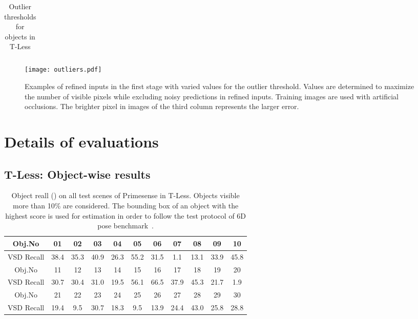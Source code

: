 \documentclass[10pt,twocolumn,letterpaper]{article}
\begin{document}
\begin{itemize}
{\begin{table}[hbt]
\begin{center}
\begin{tabular}{ c| c c c c c c c c c c c c c c c c c c c c c c c c c c c c c c}
\end{tabular}
\end{center}
\caption{Outlier thresholds  for objects in T-Less}
\end{table}

\begin{figure}[hbt]
\begin{center}
   \texttt{[image: outliers.pdf]}
\end{center}
\caption{Examples of refined inputs in the first stage with varied values for the outlier threshold. Values are determined to maximize the number of visible pixels while excluding noisy predictions in refined inputs. Training images are used with artificial occlusions. The brighter pixel in images of the third column represents the larger error.}
\label{fig:outlier}
\end{figure}
}
\end{itemize}


\newpage
\section{Details of evaluations}
\vspace{5pt}

\subsection{T-Less: Object-wise results}
\setlength{\tabcolsep}{12pt}

\begin{table}[hbt]\centering \begin{center}
\begin{tabular}{ c| c c c c c c c c c c}
  \hline
 Obj.No &01 &02 & 03 & 04 & 05 & 06 & 07 & 08 & 09 & 10  \\
 \hline
 VSD Recall   &38.4 &35.3& 40.9 & 26.3 & 55.2 & 31.5 &1.1 & 13.1 & 33.9 &45.8  \\
  \hline
  \hline
  Obj.No& 11 & 12 & 13 & 14 & 15 &16 & 17 & 18 & 19 & 20  \\
 \hline
 VSD Recall & 30.7 & 30.4 &31.0 & 19.5 & 56.1  &66.5&37.9 &45.3& 21.7 & 1.9   \\
 \hline
 \hline
  Obj.No & 21 & 22 & 23 & 24 & 25 &26 & 27 & 28 & 29& 30 \\
 \hline
 VSD Recall&19.4 & 9.5 &30.7 & 18.3 & 9.5 &13.9 & 24.4 & 43.0 & 25.8 & 28.8     \\
 \hline
 
 \end{tabular}
 \vspace{+1em}
\caption{Object reall () on all test scenes of Primesense in T-Less. Objects visible more than 10\% are considered. The bounding box of an object with the highest score is used for estimation in order to follow the test protocol of 6D pose benchmark~\cite{Hodan_2018_ECCV_bop}.}
\label{table:t-less}
\end{center}
\end{table}
\end{document}
